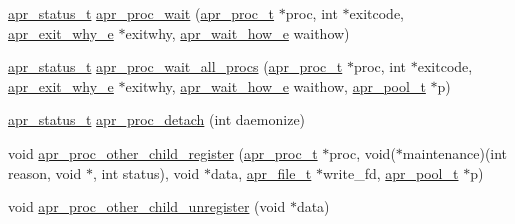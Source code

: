 \begin{DoxyCompactItemize}
\item 
\hyperlink{group__apr__errno_gaf76ee4543247e9fb3f3546203e590a6c}{apr\+\_\+status\+\_\+t} \hyperlink{group__apr__thread__proc_ga0936f7a7fe7e2d5e08979c9f343a5a1b}{apr\+\_\+proc\+\_\+wait} (\hyperlink{structapr__proc__t}{apr\+\_\+proc\+\_\+t} $\ast$proc, int $\ast$exitcode, \hyperlink{group__apr__thread__proc_gac097b4fa41e67024711c5983446d0951}{apr\+\_\+exit\+\_\+why\+\_\+e} $\ast$exitwhy, \hyperlink{group__apr__thread__proc_ga5e52d786644f3b66d6180571e68c7260}{apr\+\_\+wait\+\_\+how\+\_\+e} waithow)
\item 
\hyperlink{group__apr__errno_gaf76ee4543247e9fb3f3546203e590a6c}{apr\+\_\+status\+\_\+t} \hyperlink{group__apr__thread__proc_ga506183074e8413c3ff597539e4768ea4}{apr\+\_\+proc\+\_\+wait\+\_\+all\+\_\+procs} (\hyperlink{structapr__proc__t}{apr\+\_\+proc\+\_\+t} $\ast$proc, int $\ast$exitcode, \hyperlink{group__apr__thread__proc_gac097b4fa41e67024711c5983446d0951}{apr\+\_\+exit\+\_\+why\+\_\+e} $\ast$exitwhy, \hyperlink{group__apr__thread__proc_ga5e52d786644f3b66d6180571e68c7260}{apr\+\_\+wait\+\_\+how\+\_\+e} waithow, \hyperlink{group__apr__pools_gaf137f28edcf9a086cd6bc36c20d7cdfb}{apr\+\_\+pool\+\_\+t} $\ast$p)
\item 
\hyperlink{group__apr__errno_gaf76ee4543247e9fb3f3546203e590a6c}{apr\+\_\+status\+\_\+t} \hyperlink{group__apr__thread__proc_ga56c2b005792752b63d804f2021596406}{apr\+\_\+proc\+\_\+detach} (int daemonize)
\item 
void \hyperlink{group__apr__thread__proc_ga5a9d123afe81eaa97955fbe45704b662}{apr\+\_\+proc\+\_\+other\+\_\+child\+\_\+register} (\hyperlink{structapr__proc__t}{apr\+\_\+proc\+\_\+t} $\ast$proc, void($\ast$maintenance)(int reason,                                                                                                                                                                                                                                                       void $\ast$,                                                                                                                                                                                                                                                       int status), void $\ast$data, \hyperlink{group__apr__file__io_gaa46e4763ac375ea3c7a43ba6f6099e22}{apr\+\_\+file\+\_\+t} $\ast$write\+\_\+fd, \hyperlink{group__apr__pools_gaf137f28edcf9a086cd6bc36c20d7cdfb}{apr\+\_\+pool\+\_\+t} $\ast$p)
\item 
void \hyperlink{group__apr__thread__proc_ga10b1a4b224566c03c97f100ac8a2c830}{apr\+\_\+proc\+\_\+other\+\_\+child\+\_\+unregister} (void $\ast$data)

\end{DoxyCompactItemize}
